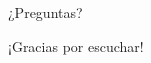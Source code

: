 \documentclass[12pt]{beamer}
\begin{document}
\begin{frame}
 {\Huge ¿Preguntas?}
\end{frame}

\begin{frame}
 {\Huge ¡Gracias por escuchar!}
\end{frame}



% 
% 
% 
% 

\begin{frame}
\begin{figure}[center]
\end{figure}
\end{frame}
\end{document}
